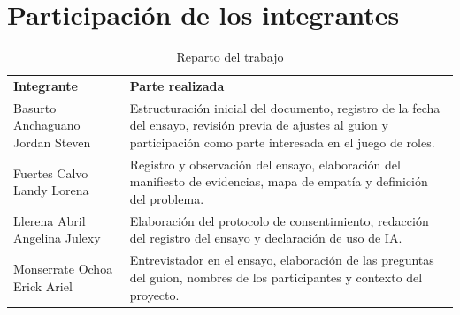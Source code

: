 \documentclass[12pt,a4paper]{article}
\begin{document}
\section{Participación de los integrantes}

\begin{table}[H]
\centering
\small
\begin{tabularx}{\textwidth}{>{\raggedright\arraybackslash}p{5.5cm} Y}
\textbf{Integrante} & \textbf{Parte realizada} \\
Basurto Anchaguano Jordan Steven & Estructuración inicial del documento, registro de la fecha del ensayo, revisión previa de ajustes al guion y participación como parte interesada en el juego de roles. \\
Fuertes Calvo Landy Lorena & Registro y observación del ensayo, elaboración del manifiesto de evidencias, mapa de empatía y definición del problema. \\
Llerena Abril Angelina Julexy & Elaboración del protocolo de consentimiento, redacción del registro del ensayo y declaración de uso de IA. \\
Monserrate Ochoa Erick Ariel & Entrevistador en el ensayo, elaboración de las preguntas del guion, nombres de los participantes y contexto del proyecto. \\
\end{tabularx}
\caption{Reparto del trabajo}
\end{table}
\end{document}
